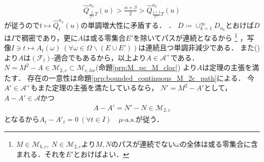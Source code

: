 \begin{prf}
\begin{description}
{\begin{align}
						\hat{Q}_{\frac{j}{2^{n_k}}T}^{n_\nu}(u) > \frac{\alpha + \beta}{2} > \hat{Q}_{\frac{j+1}{2^{n_k}}T}^{n_\nu}(u)
					\end{align}
					が従うので$t \longmapsto \hat{Q}_t^{n_\nu}(u)$の単調増大性に矛盾する．
				}．
				$D \coloneqq \cup_{k=1}^{\infty} D_{n_k}$とおけば$D$は$I$で稠密であり，更に$A$は或る零集合$E'$を除いてパスが連続となるから
				\footnote{
					$M \in \mathcal{M}_{b,c},\ N \in \mathcal{M}_{2,c}$より$M,N$のパスが連続でない$\omega$の全体は或る零集合に含まれる．それを$E'$とおけばよい．
				}
				，写像$I \ni t \longmapsto A_t(\omega)\ (\forall \omega \in \Omega \backslash (E \cup E'))$は連続且つ単調非減少である．
				また()より$A$は$(\mathcal{F}_t)$-適合でもあるから，以上より$A \in \mathcal{A}^+$である．
				$N = M^2 - A \in \mathcal{M}_{2,c} \subset \mathcal{M}_{c,loc}$(命題\ref{prp:M_pc_M_cloc})
				より$A$は定理の主張を満たす．
				存在の一意性は命題\ref{prp:bounded_continuous_M_2c_path}による．
				今$A' \in \mathcal{A}^+$もまた定理の主張を満たしているなら，
				$N' = M^2 - A'$として，$A - A' \in \mathcal{A}$かつ
				\begin{align}
					A - A' = N' - N \in \mathcal{M}_{2,c}
				\end{align}
				となるから$A_t - A'_t = 0\ (\forall t \in I)\quad \mbox{$\mu$-a.s.}$が従う．
				

\end{description}
\end{prf}
